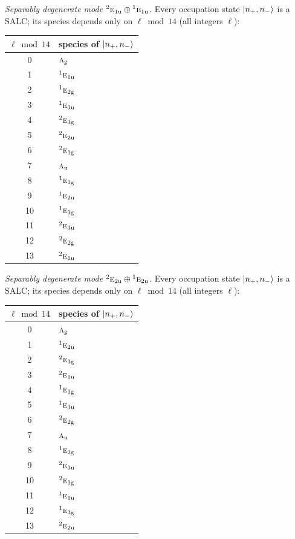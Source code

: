 \documentclass[11pt]{article}
\newcommand{\irr}[1]{\text{\normalfont\scshape #1}}
\newcommand{\conjpair}[1]{{}^{#1}}
\newcommand{\ptag}[1]{\mathrm{#1}}
\begin{document}
\emph{Separably degenerate mode $\conjpair{2}\irr{e}_{1\ptag{u}}\oplus \conjpair{1}\irr{e}_{1\ptag{u}}$.} Every occupation state $\ket{n_+,n_-}$ is a SALC; its species depends only on $\ell\bmod 14$ (all integers $\ell$):
\begin{longtable}{c l}\hline $\ell\bmod 14$ & species of $\ket{n_+,n_-}$\\ \hline\endhead
0 & $\irr{a}_{\ptag{g}}$\\
1 & $\conjpair{1}\irr{e}_{1\ptag{u}}$\\
2 & $\conjpair{1}\irr{e}_{2\ptag{g}}$\\
3 & $\conjpair{1}\irr{e}_{3\ptag{u}}$\\
4 & $\conjpair{2}\irr{e}_{3\ptag{g}}$\\
5 & $\conjpair{2}\irr{e}_{2\ptag{u}}$\\
6 & $\conjpair{2}\irr{e}_{1\ptag{g}}$\\
7 & $\irr{a}_{\ptag{u}}$\\
8 & $\conjpair{1}\irr{e}_{1\ptag{g}}$\\
9 & $\conjpair{1}\irr{e}_{2\ptag{u}}$\\
10 & $\conjpair{1}\irr{e}_{3\ptag{g}}$\\
11 & $\conjpair{2}\irr{e}_{3\ptag{u}}$\\
12 & $\conjpair{2}\irr{e}_{2\ptag{g}}$\\
13 & $\conjpair{2}\irr{e}_{1\ptag{u}}$\\
\hline\end{longtable}

\emph{Separably degenerate mode $\conjpair{2}\irr{e}_{2\ptag{u}}\oplus \conjpair{1}\irr{e}_{2\ptag{u}}$.} Every occupation state $\ket{n_+,n_-}$ is a SALC; its species depends only on $\ell\bmod 14$ (all integers $\ell$):
\begin{longtable}{c l}\hline $\ell\bmod 14$ & species of $\ket{n_+,n_-}$\\ \hline\endhead
0 & $\irr{a}_{\ptag{g}}$\\
1 & $\conjpair{1}\irr{e}_{2\ptag{u}}$\\
2 & $\conjpair{2}\irr{e}_{3\ptag{g}}$\\
3 & $\conjpair{2}\irr{e}_{1\ptag{u}}$\\
4 & $\conjpair{1}\irr{e}_{1\ptag{g}}$\\
5 & $\conjpair{1}\irr{e}_{3\ptag{u}}$\\
6 & $\conjpair{2}\irr{e}_{2\ptag{g}}$\\
7 & $\irr{a}_{\ptag{u}}$\\
8 & $\conjpair{1}\irr{e}_{2\ptag{g}}$\\
9 & $\conjpair{2}\irr{e}_{3\ptag{u}}$\\
10 & $\conjpair{2}\irr{e}_{1\ptag{g}}$\\
11 & $\conjpair{1}\irr{e}_{1\ptag{u}}$\\
12 & $\conjpair{1}\irr{e}_{3\ptag{g}}$\\
13 & $\conjpair{2}\irr{e}_{2\ptag{u}}$\\
\hline\end{longtable}
\end{document}
